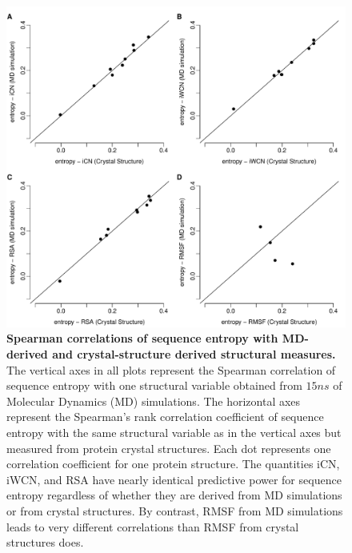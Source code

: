 \documentclass[12pt]{article}
\begin{document}
\begin{figure}[tbh]
\begin{center}
    \includegraphics[height=0.7\textheight]{cor_cr_md.pdf}
\end{center}
\caption{\textbf{Spearman correlations of sequence entropy with MD-derived and crystal-structure derived structural measures.}
The vertical axes in all plots represent the Spearman correlation of sequence entropy with one structural variable obtained from $15ns$ of Molecular Dynamics (MD) simulations. The horizontal axes represent the Spearman's rank correlation coefficient of sequence entropy with the same structural variable as in the vertical axes but measured from protein crystal structures. Each dot represents one correlation coefficient for one protein structure. The quantities iCN, iWCN, and RSA have nearly identical predictive power for sequence entropy regardless of whether they are derived from MD simulations or from crystal structures. By contrast, RMSF from MD simulations leads to very different correlations than RMSF from crystal structures does.
}
\label{fig:cor_cr_md}
\end{figure}
\end{document}
